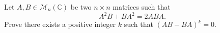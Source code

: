 Let \(A,B\in \mathcal{M}_n(\mathbb{C})\) be two \(n \times n\) matrices such that \[ A^2B+BA^2=2ABA. \]
Prove there exists a positive integer \(k\) such that \( (AB-BA)^k = 0 \).